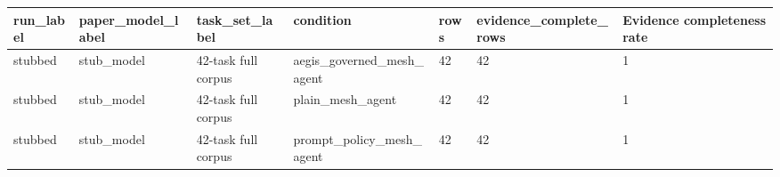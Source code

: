 \begin{tabular}{lllllll}
 \hline
run\_label & paper\_model\_label & task\_set\_label & condition & rows & evidence\_complete\_rows & Evidence completeness rate \\
 \hline
stubbed & stub\_model & 42-task full corpus & aegis\_governed\_mesh\_agent & 42 & 42 & 1 \\
stubbed & stub\_model & 42-task full corpus & plain\_mesh\_agent & 42 & 42 & 1 \\
stubbed & stub\_model & 42-task full corpus & prompt\_policy\_mesh\_agent & 42 & 42 & 1 \\
 \hline
\end{tabular}
